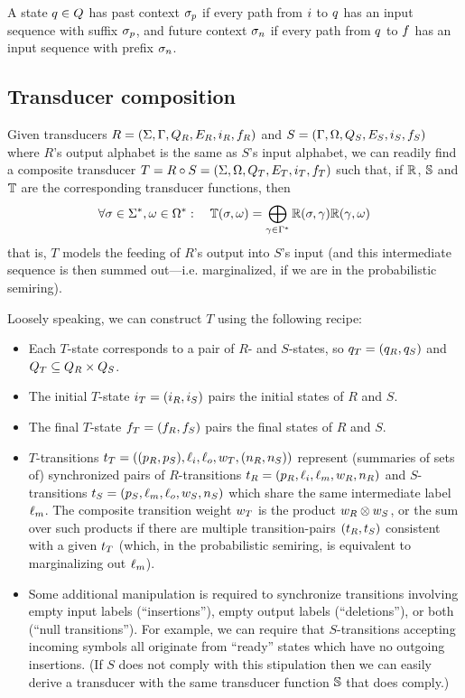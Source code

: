 \documentclass[english]{article}
\begin{document}
A state $q \in Q$ has past context $\sigma_p$ if every path from $i$ to $q$ has an input sequence with suffix $\sigma_p$,
and future context $\sigma_n$ if every path from $q$ to $f$ has an input sequence with prefix $\sigma_n$.

\subsection*{Transducer composition}

Given transducers
 $R = (\Sigma, \Gamma, Q_R, E_R, i_R, f_R)$ and
 $S = (\Gamma, \Omega, Q_S, E_S, i_S, f_S)$
where $R$'s output alphabet is the same as $S$'s input alphabet,
we can readily find a composite transducer
 $T = R \circ S = (\Sigma, \Omega, Q_T, E_T, i_T, f_T)$
such that, if $\mathbb{R}$, $\mathbb{S}$ and $\mathbb{T}$ are the corresponding transducer functions,
then
\[
\forall \sigma \in {\Sigma}^{\ast}, \omega \in {\Omega}^{\ast}:
\quad
\mathbb{T}(\sigma,\omega) = \bigoplus_{\gamma \in {\Gamma}^{\ast}} \mathbb{R}(\sigma,\gamma) \mathbb{R}(\gamma,\omega)
\]
that is, $T$ models the feeding of $R$'s output into $S$'s input
(and this intermediate sequence is then summed out---i.e. marginalized, if we are in the probabilistic semiring).

Loosely speaking, we can construct $T$ using the following recipe:
\begin{itemize}
\item Each $T$-state corresponds to a pair of $R$- and $S$-states,
so $q_T = (q_R, q_S)$
and $Q_T \subseteq Q_R \times Q_S$.
\item The initial $T$-state $i_T=(i_R,i_S)$ pairs the initial states of $R$ and $S$.
\item The final $T$-state $f_T=(f_R,f_S)$ pairs the final states of $R$ and $S$.
\item $T$-transitions
$t_T = ((p_R,p_S),\ell_i,\ell_o,w_T,(n_R,n_S))$
represent (summaries of sets of) synchronized pairs of $R$-transitions
$t_R = (p_R,\ell_i,\ell_m,w_R,n_R)$
and $S$-transitions
$t_S = (p_S,\ell_m,\ell_o,w_S,n_S)$
which share the same intermediate label $\ell_m$.
The composite transition weight $w_T$ is the product $w_R \otimes w_S$,
or the sum over such products if there are multiple transition-pairs $(t_R,t_S)$
consistent with a given $t_T$
(which, in the probabilistic semiring, is equivalent to marginalizing out $\ell_m$).
\item Some additional manipulation is required to synchronize
transitions involving empty input labels (``insertions''),
empty output labels (``deletions''),
or both (``null transitions'').
For example, we can require that $S$-transitions accepting incoming symbols
all originate from ``ready'' states which have no outgoing insertions.
(If $S$ does not comply with this stipulation then we can easily derive a transducer
with the same transducer function $\mathbb{S}$ that does comply.)
\end{itemize}
\end{document}
